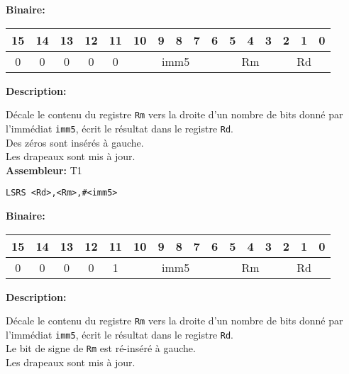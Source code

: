 \textbf{Binaire:}\\

\begin{tabular}{| c c c c c c c c c c c c c c c c |}
\hline
15 & 14 & 13 & \multicolumn{1}{|c}{12} & 11 & \multicolumn{1}{|c}{10} & 9 & 8 & 7 & 6 & \multicolumn{1}{|c}{5} & 4 & 3 & \multicolumn{1}{|c}{2} & 1 & 0 \\
\hline
0 & 0 & 0 & \multicolumn{1}{|c}{0} & 0 & \multicolumn{5}{|c|}{imm5} & \multicolumn{3}{|c|}{Rm} & \multicolumn{3}{|c|}{Rd} \\
\hline
\end{tabular}


\textbf{Description: }

Décale le contenu du registre \texttt{Rm} vers la droite d'un nombre de bits donné par l'immédiat \texttt{imm5}, écrit le résultat dans le registre \texttt{Rd}.\\
Des zéros sont insérés à gauche.\\
Les drapeaux sont mis à jour.\\

\textbf{Assembleur:} T1

\begin{lstlisting}
LSRS <Rd>,<Rm>,#<imm5>
\end{lstlisting}

\textbf{Binaire:}\\

\begin{tabular}{| c c c c c c c c c c c c c c c c |}
\hline
15 & 14 & 13 & \multicolumn{1}{|c}{12} & 11 & \multicolumn{1}{|c}{10} & 9 & 8 & 7 & 6 & \multicolumn{1}{|c}{5} & 4 & 3 & \multicolumn{1}{|c}{2} & 1 & 0 \\
\hline   
0 & 0 & 0 & \multicolumn{1}{|c}{0} & 1 & \multicolumn{5}{|c|}{imm5} & \multicolumn{3}{|c|}{Rm} & \multicolumn{3}{|c|}{Rd} \\
\hline
\end{tabular}



\textbf{Description: }

Décale le contenu du registre \texttt{Rm} vers la droite d'un nombre de bits donné par l'immédiat \texttt{imm5}, écrit le résultat dans le registre \texttt{Rd}.\\
Le bit de signe de \texttt{Rm} est ré-inséré à gauche.\\
Les drapeaux sont mis à jour.\\

